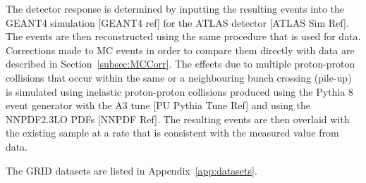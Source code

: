 The detector response is determined by inputting the resulting events into the GEANT4 simulation [GEANT4 ref] for the ATLAS detector [ATLAS Sim Ref]. The events are then reconstructed using the same procedure that is used for data. Corrections made to MC events in order to compare them directly with data are described in Section~\ref{subsec:MCCorr}.
The effects due to multiple proton-proton collisions that occur within the same or a neighbouring bunch crossing (pile-up) is simulated using inelastic proton-proton collisions produced using the Pythia 8 event generator with the A3 tune [PU Pythia Tune Ref] and using the NNPDF2.3LO PDFs [NNPDF Ref]. The resulting events are
then overlaid with the existing sample at a rate that is consistent with the measured value from data.

The GRID datasets are listed in Appendix~\ref{app:datasets}.
